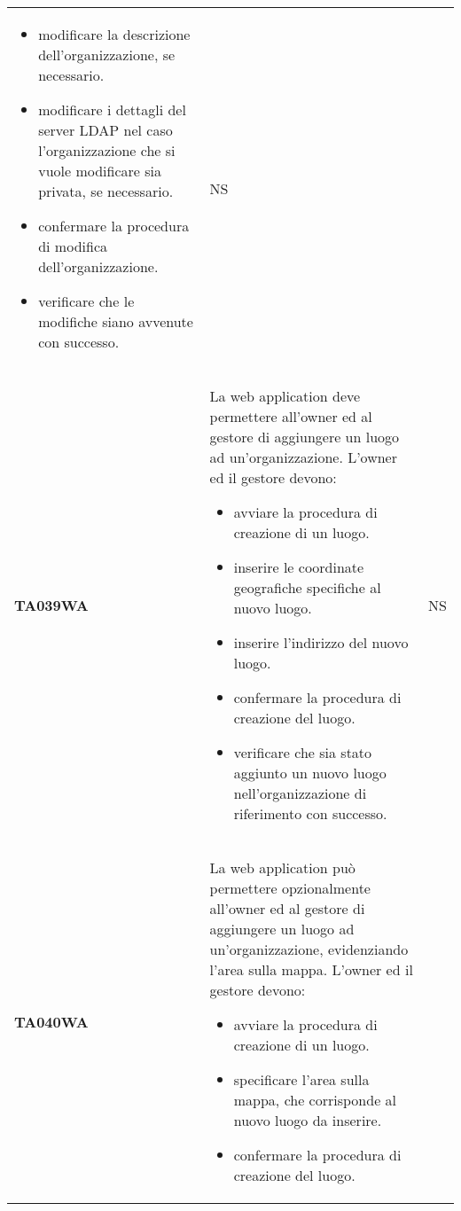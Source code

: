 \documentclass[../piano-di-qualifica.tex]{subfiles}
\begin{document}
\begin{longtable}[H]{>{\centering\bfseries}m{3cm} >{}m{10cm} >{\centering\arraybackslash}m{3cm}}
\begin{itemize}
    \item modificare la descrizione dell'organizzazione, se necessario.
    \item modificare i dettagli del server LDAP nel caso l'organizzazione che si vuole modificare sia privata, se necessario.
    \item confermare la procedura di modifica dell'organizzazione.
    \item verificare che le modifiche siano avvenute con successo.
  \end{itemize}
                    & NS                                                                                                                                                                                                                                                               \\
  TA039WA           & La web application deve permettere all'owner ed al gestore di aggiungere un luogo ad un'organizzazione. \newline
  L'owner ed il gestore devono:
  \begin{itemize}
    \item avviare la procedura di creazione di un luogo.
    \item inserire le coordinate geografiche specifiche al nuovo luogo.
    \item inserire l'indirizzo del nuovo luogo.
    \item confermare la procedura di creazione del luogo.
    \item verificare che sia stato aggiunto un nuovo luogo nell'organizzazione di riferimento con successo.
  \end{itemize}
                    & NS                                                                                                                                                                                                                                                               \\
  TA040WA           & La web application può permettere opzionalmente all'owner ed al gestore di aggiungere un luogo ad un'organizzazione, evidenziando l'area sulla mappa. \newline
  L'owner ed il gestore devono:
  \begin{itemize}
    \item avviare la procedura di creazione di un luogo.
    \item specificare l'area sulla mappa, che corrisponde al nuovo luogo da inserire.
    \item confermare la procedura di creazione del luogo.

\end{itemize}
\end{longtable}
\end{document}
